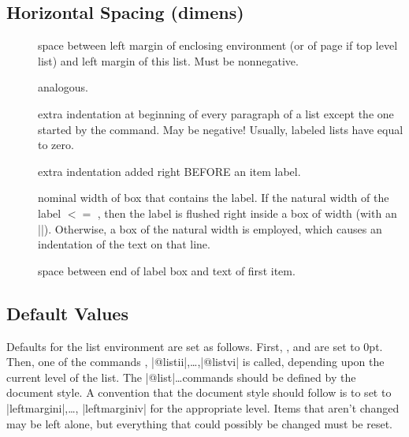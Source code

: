  \subsection{Horizontal Spacing (dimens)}
 \begin{description}
 \item[]   space between left margin of enclosing
   environment (or of page if top level list) and left margin of
                     this list.  Must be nonnegative.
  \item[]  analogous.
  \item[]  extra indentation at beginning of every
     paragraph of a list except the one started by the 
                      command.  May be negative!  Usually, labeled
                       lists have  equal to zero.
   \item[]   extra indentation added right BEFORE an item
                      label.
  \item[]  nominal width of box that contains the label.
                      If the natural width of the
                         label $< =$ ,
                      then the label is flushed right inside a box
                      of width  (with an |\hfil|).
                      Otherwise,
                      a box of the natural width is employed, which
                       causes an indentation of the text on that line.
     \item[]  space between end of label box and text of
                      first item.
  \end{description}


 \subsection{Default Values}
 
 Defaults for the list environment are set as follows.
 First, ,  and 
 are set
      to 0pt.  Then, one of the commands
      , |@listii|,\ldots,|@listvi|
      is called, depending upon the current level of the list.
      The |@list|\ldots commands should be defined by the document
      style.  A convention that the document style should follow is
      to set  to
      |leftmargini|,\ldots, |leftmarginiv| for
      the appropriate level.  Items that aren't changed may be left
      alone, but everything that could possibly be changed must be
      reset.



